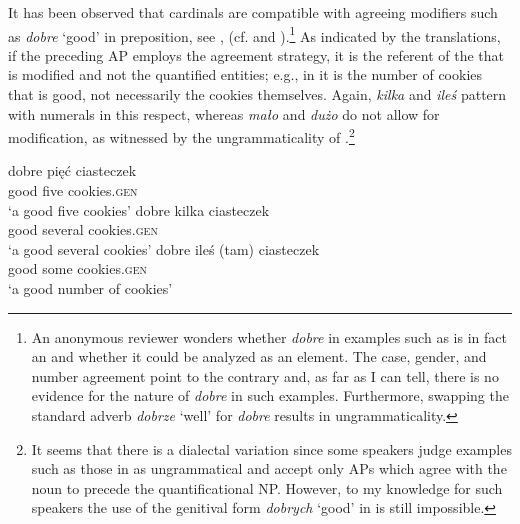 \documentclass[output=paper, newtxmath, colorlinks, citecolor=brown]{langsci/langscibook}
\begin{document}
	It has been observed that  cardinals are compatible with agreeing  modifiers such as \textit{dobre} `good' in preposition, see , (cf. \citealt{babby1987case} and \citealt{miechowicz-mathiasen2011syntax}).\footnote{An anonymous reviewer wonders whether \textit{dobre} in examples such as  is in fact an  and whether it could be analyzed as an  element. The case, gender, and number agreement point to the contrary and, as far as I can tell, there is no evidence for the  nature of \textit{dobre} in such examples. Furthermore, swapping the standard adverb \textit{dobrze} `well' for \textit{dobre} results in ungrammaticality.} As indicated by the translations, if the preceding AP employs the agreement strategy, it is the referent of the  that is modified and not the quantified entities; e.g., in  it is the number of cookies that is good, not necessarily the cookies themselves. Again, \textit{kilka} and \textit{ileś} pattern with  numerals in this respect, whereas \textit{mało} and \textit{dużo} do not allow for  modification, as witnessed by the ungrammaticality of .\footnote{It seems that there is a dialectal variation since some  speakers judge examples such as those in  as ungrammatical and accept only APs which agree with the noun to precede the quantificational NP. However, to my knowledge for such speakers the use of the genitival form \textit{dobrych} `good' in  is still impossible.}

	\ea \label{ex:adjectival-modifiers-agreement} \ea \gll dobre pięć ciasteczek\label{ex:adjectival-modifiers-agreement-cardinals}\\
	good five cookies.\textsc{gen}\\
	\glt `a good five cookies'
	\ex \gll dobre kilka ciasteczek\\
	good several cookies.\textsc{gen}\\
	\glt `a good several cookies'
	\ex \gll dobre {ileś (tam)} ciasteczek\\
	good some cookies.\textsc{gen}\\
	\glt `a good number of cookies'
	\z
    \z

	\ea \label{ex:adjectival-modifiers-agreement-malo} 
	\z
    \z
\end{document}
